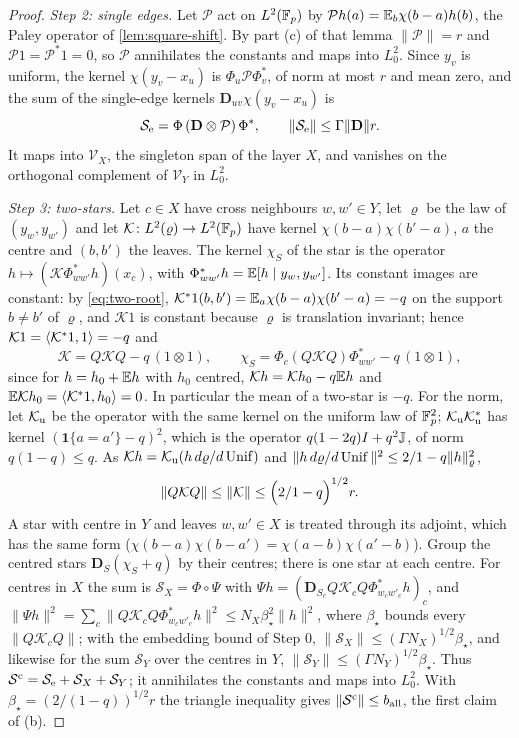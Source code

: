 \begin{proof}
\emph{Step 2: single edges.} Let $\mathcal P$ act on $L^2(\Fp)$ by
$\mathcal Ph(a)=\E_b\chi(b-a)h(b)$, the Paley operator of
\cref{lem:square-shift}. By part (c) of that lemma $\|\mathcal P\|=r$ and
$\mathcal P1=\mathcal P^*1=0$, so $\mathcal P$ annihilates the constants and
maps into $L^2_0$. Since $y_v$ is uniform, the
kernel $\chi(y_v-x_u)$ is $\Phi_u\mathcal P\Phi_v^*$, of norm at most $r$ and
mean zero, and the sum of the single-edge kernels $\mathbf D_{uv}\chi(y_v-x_u)$ is
\[
 \mathcal S_{\rm e}=\Phi\,(\mathbf D\otimes\mathcal P)\,\Phi^*,\qquad
 \|\mathcal S_{\rm e}\|\le\Gamma\|\mathbf D\|r .
\]
It maps into $\mathcal V_X$, the singleton span of the layer $X$, and
vanishes on the orthogonal complement of $\mathcal V_Y$ in $L^2_0$.

\emph{Step 3: two-stars.} Let $c\in X$ have cross neighbours $w,w'\in Y$, let
$\varrho$ be the law of $(y_w,y_{w'})$ and let
$\mathcal K\colon L^2(\varrho)\to L^2(\Fp)$ have kernel
$\chi(b-a)\chi(b'-a)$, $a$ the centre and $(b,b')$ the leaves. The kernel
$\chi_S$ of the star is the operator $h\mapsto(\mathcal K\Phi_{ww'}^*h)(x_c)$,
with $\Phi_{ww'}^*h=\E[h\mid y_w,y_{w'}]$. Its constant images are constant: by
\eqref{eq:two-root}, $\mathcal K^*1(b,b')=\E_a\chi(b-a)\chi(b'-a)=-q$ on the
support $b\ne b'$ of $\varrho$, and $\mathcal K1$ is constant because $\varrho$
is translation invariant; hence $\mathcal K1=\ip{\mathcal K^*1}1=-q$ and
\[
 \mathcal K=Q\mathcal KQ-q\,(1\otimes1),\qquad
 \chi_S=\Phi_c(Q\mathcal KQ)\Phi_{ww'}^*-q\,(1\otimes1),
\]
since for $h=h_0+\E h$ with $h_0$ centred, $\mathcal Kh=\mathcal Kh_0-q\E h$ and
$\E\mathcal Kh_0=\ip{\mathcal K^*1}{h_0}=0$. In particular the mean of a
two-star is $-q$. For the norm, let $\mathcal K_{\rm u}$ be the operator with the
same kernel on the uniform law of $\Fp^2$; $\mathcal K_{\rm u}\mathcal
K_{\rm u}^*$ has kernel $(\mathbf 1\{a=a'\}-q)^2$, which is the operator
$q(1-2q)I+q^2\Jproj$, of norm $q(1-q)\le q$. As $\mathcal Kh=\mathcal K_{\rm u}
(h\,d\varrho/d\Unif)$ and $\|h\,d\varrho/d\Unif\|^2\le\frac2{1-q}\|h\|_\varrho^2$,
\[
 \|Q\mathcal KQ\|\le\|\mathcal K\|\le\Bigl(\frac2{1-q}\Bigr)^{1/2}r .
\]
A star with centre in $Y$ and leaves $w,w'\in X$ is treated through its
adjoint, which has the same form ($\chi(b-a)\chi(b-a')=\chi(a-b)\chi(a'-b)$).
Group the centred stars $\mathbf D_S(\chi_S+q)$ by their centres; there is one
star at each centre. For centres in $X$ the sum is $\mathcal S_X=\Phi\circ\Psi$
with $\Psi h=(\mathbf D_{S_c}Q\mathcal K_cQ\Phi^*_{w_cw'_c}h)_c$, and $\|\Psi h\|^2=\sum_c
\|Q\mathcal K_cQ\Phi^*_{w_cw'_c}h\|^2\le N_X\beta_\star^2\|h\|^2$, where
$\beta_\star$ bounds every $\|Q\mathcal K_cQ\|$; with the embedding bound of
Step 0, $\|\mathcal S_X\|\le(\Gamma N_X)^{1/2}\beta_\star$, and likewise for the
sum $\mathcal S_Y$ over the centres in $Y$,
$\|\mathcal S_Y\|\le(\Gamma N_Y)^{1/2}\beta_\star$. Thus
$\mathcal S^{\rm c}=\mathcal S_{\rm e}+\mathcal S_X+\mathcal S_Y$; it
annihilates the constants and maps into $L^2_0$. With
$\beta_\star=(2/(1-q))^{1/2}r$ the triangle inequality gives
$\|\mathcal S^{\rm c}\|\le b_{\rm all}$, the first claim of (b).


\end{proof}
